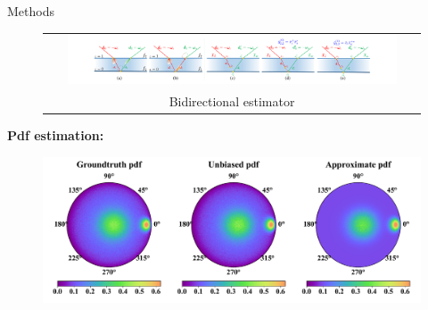 \documentclass[final]{beamer}
\newlength{\twocolwid}
\begin{document}
\begin{frame}[t]
\begin{columns}[t]
\begin{column}{\twocolwid}
\begin{block}{Methods}
            \begin{figure}
                \begin{tabular}{c}
                    \includegraphics[width=0.9\textwidth]{images/illustration/bidir.pdf}\\
                    \small{Bidirectional estimator}
                \end{tabular}
            \end{figure}

            \textbf{Pdf estimation:}
            \begin{figure}
            	\includegraphics[width=0.65\columnwidth]{images/validations/lobe_pdf/pdf.pdf}
            \end{figure}
        \end{block}
        
        \vspace{0.5cm}
        

\end{column}
\end{columns}
\end{frame}
\end{document}

